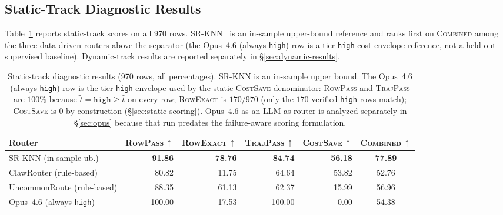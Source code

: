 \subsection{Static-Track Diagnostic Results}
\label{sec:main-results}

Table~\ref{tab:main-results} reports static-track scores on all 970 rows.
SR-KNN~\citep{liu2026vllmsemanticrouter} is an in-sample upper-bound reference and ranks first on
\textsc{Combined} among the three data-driven routers above the separator (the
Opus~4.6 (always-\texttt{high}) row is a tier-\texttt{high} cost-envelope reference, not a
held-out supervised baseline). Dynamic-track results
are reported separately in \S\ref{sec:dynamic-results}.

\begin{table}[t]
\centering
\small
\begin{adjustbox}{max width=\linewidth}
\begin{tabular}{lrrrrc}
\toprule
Router & \textsc{RowPass}\,$\uparrow$ & \textsc{RowExact}\,$\uparrow$ & \textsc{TrajPass}\,$\uparrow$ & \textsc{CostSave}\,$\uparrow$ & \textbf{\textsc{Combined}}\,$\uparrow$ \\
\midrule
SR-KNN (in-sample ub.)       & \textbf{91.86} & \textbf{78.76} & \textbf{84.74} & \textbf{56.18} & \textbf{77.89} \\
ClawRouter (rule-based)      & 80.82 & 11.75 & 64.64 & 53.82 & 52.76 \\
UncommonRoute (rule-based)   & 88.35 & 61.13 & 62.37 & 15.99 & 56.96 \\
\midrule
Opus~4.6 (always-\texttt{high}) & 100.00 & 17.53 & 100.00 & 0.00 & 54.38 \\
\bottomrule
\end{tabular}
\end{adjustbox}
\caption{Static-track diagnostic results (970 rows, all percentages). SR-KNN
is an in-sample upper bound. The Opus~4.6 (always-\texttt{high}) row is the tier-\texttt{high}
envelope used by the static \textsc{CostSave} denominator: \textsc{RowPass} and
\textsc{TrajPass} are $100\%$ because $\tilde{t}=\texttt{high}\ge\hat{t}$ on every
row; \textsc{RowExact} is $170/970$ (only the $170$ verified-\texttt{high} rows match);
\textsc{CostSave} is $0$ by construction (\S\ref{sec:static-scoring}). Opus~4.6 as
an LLM-as-router is analyzed separately in \S\ref{sec:opus} because that run predates
the failure-aware scoring formulation.}
\label{tab:main-results}
\end{table}

